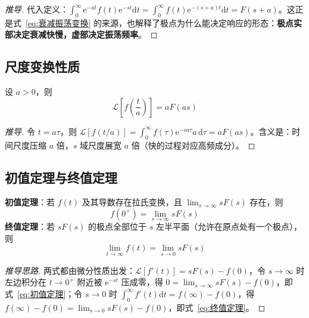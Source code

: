 \begin{proof}[推导]
代入定义：$\int_{0}^{\infty}\mathrm{e}^{-at}f(t)\mathrm{e}^{-st}\mathrm{d}t=\int_{0}^{\infty}f(t)\mathrm{e}^{-(s+a)t}\mathrm{d}t=F(s+a)$。这正是式~\eqref{eq:衰减振荡变换} 的来源，也解释了极点为什么能决定响应的形态：\textbf{极点实部决定衰减快慢，虚部决定振荡频率}。
\end{proof}

\subsection{尺度变换性质}

\begin{property}[尺度变换]
设 $a>0$，则
\begin{equation}
\mathcal{L}\left[f\left(\frac{t}{a}\right)\right]=aF(as)
\label{eq:尺度变换}
\end{equation}
\end{property}

\begin{proof}[推导]
令 $t=a\tau$，则 $\mathcal{L}\left[f(t/a)\right]=\int_{0}^{\infty}f(\tau)\mathrm{e}^{-sa\tau}a\,\mathrm{d}\tau=aF(as)$。含义是：时间尺度压缩 $a$ 倍，$s$ 域尺度展宽 $a$ 倍（快的过程对应高频成分）。
\end{proof}

\subsection{初值定理与终值定理}

\begin{property}[初值定理与终值定理]
\textbf{初值定理}：若 $f(t)$ 及其导数存在拉氏变换，且 $\lim_{s\to\infty}sF(s)$ 存在，则
\begin{equation}
f(0^{+})=\lim_{s\to\infty}sF(s)
\label{eq:初值定理}
\end{equation}
\textbf{终值定理}：若 $sF(s)$ 的极点全部位于 $s$ 左半平面（允许在原点处有一个极点），则
\begin{equation}
\lim_{t\to\infty}f(t)=\lim_{s\to0}sF(s)
\label{eq:终值定理}
\end{equation}
\end{property}

\begin{proof}[推导思路]
两式都由微分性质出发：$\mathcal{L}[f'(t)]=sF(s)-f(0)$，令 $s\to\infty$ 时左边积分在 $t\to 0^{+}$ 附近被 $\mathrm{e}^{-st}$ 压成零，得 $0=\lim_{s\to\infty}sF(s)-f(0)$，即式~\eqref{eq:初值定理}；令 $s\to0$ 时 $\int_{0}^{\infty}f'(t)\mathrm{d}t=f(\infty)-f(0)$，得 $f(\infty)-f(0)=\lim_{s\to0}sF(s)-f(0)$，即式~\eqref{eq:终值定理}。
\end{proof}


